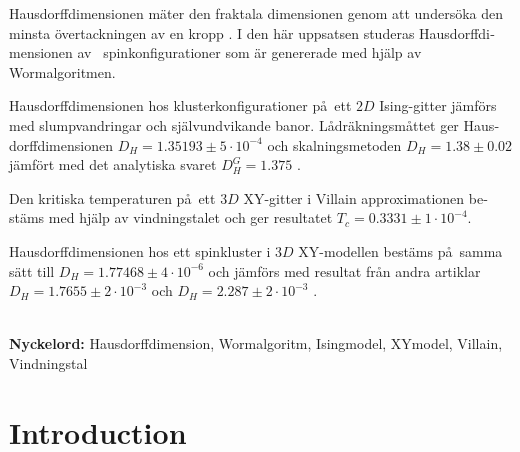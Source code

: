 \documentclass[nocoverpage,swedish,g5paper]{thesis}
\begin{document}
\begin{otherlanguage}{swedish}
\begin{foreginabstract}
Hausdorffdimensionen  m\"ater den fraktala dimensionen genom att unders\"oka den minsta \"overtackningen av en kropp \cite{Heinonen:HausdorffDimMath}. I den h\"ar uppsatsen studeras Hausdorffdimensionen av \ spinkonfigurationer som \"ar genererade med hj\"alp av Wormalgoritmen.

Hausdorffdimensionen hos klusterkonfigurationer p\aa \ ett $2D$ Ising-gitter j\"amf\"ors med slumpvandringar och sj\"alvundvikande banor. L\aa dr\"akningsm\aa ttet \cite{strogatz:dynamics_chaos} ger Hausdorffdimensionen $D_H = 1.35193 \pm 5 \cdot 10^{-4}$ och skalningsmetoden \cite{Hove:hausdorff_crit_fluctuations} $D_H = 1.38 \pm 0.02$ j\"amf\"ort med det analytiska svaret $D_H^{G} = 1.375$ \cite{Duplantier:GeoHausdorff}.

Den kritiska temperaturen p\aa \  ett $3D$ XY-gitter i Villain approximationen best\"ams med hj\"alp av vindningstalet och ger resultatet $T_c = 0.3331 \pm 1 \cdot 10^{-4}$.

Hausdorffdimensionen hos ett spinkluster i $3D$ XY-modellen best\"ams p\aa\  samma s\"att till $D_H = 1.77468 \pm 4 \cdot 10^{-6}$ och j\"amf\"ors med resultat fr\aa n andra artiklar $D_H = 1.7655 \pm 2 \cdot 10^{-3}$ \cite{Prokofev:comment_on_hove_hausdorff_crit_fluct} och $D_H = 2.287 \pm 2 \cdot 10^{-3}$ \cite{Hove:hausdorff_crit_fluctuations}.
\\ \noindent \strut \\
\textbf{Nyckelord:} Hausdorffdimension, Wormalgoritm, Isingmodel, XYmodel, Villain, Vindningstal
\end{foreginabstract}
\end{otherlanguage}

\begin{preface}

\end{preface}

\tableofcontents

\mainmatter


\chapter{Introduction}

\end{document}
